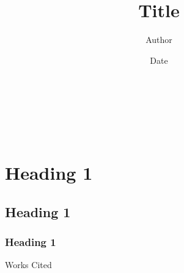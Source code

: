 \documentclass[12pt]{article}
\title{Title}
\author{Author}
\date{Date}
\makeatletter
\newcommand{\referencelist}{
	\pagebreak
	\begin{center}
		Works Cited
	\end{center}
	\printbibliography[heading=none]
}
\newcommand{\settitlepage}{%
	\noindent \@author\\
	\noindent\@instructor\\
	\noindent\@course\\
	\noindent\@date
	\begin{center}
		{\@title}
	\end{center}
}
\makeatother
\begin{document}
\settitlepage%


\section{Heading 1}
\lipsum[1]
\subsection{Heading 1}
\lipsum[1]
\subsubsection{Heading 1}
\lipsum[1]



\referencelist%
\end{document}
